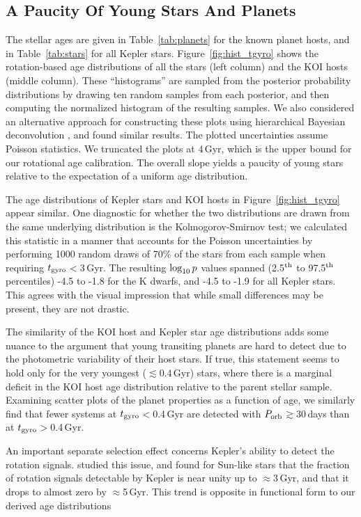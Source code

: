 \documentclass[11pt,twocolumn,tighten,linenumbers,trackchanges]{aastex63}
\begin{document}
\subsection{A Paucity Of Young Stars And Planets}

The stellar ages are given in Table~\ref{tab:planets} for the known
planet hosts, and in Table~\ref{tab:stars} for all Kepler stars.
Figure~\ref{fig:hist_tgyro} shows the rotation-based age distributions
of all the stars (left column) and the KOI hosts (middle column).
These ``histograms'' are sampled from the posterior probability
distributions by drawing ten random samples from each posterior, and
then computing the normalized histogram of the resulting samples.
We also considered an alternative approach for constructing these
plots using hierarchical Bayesian deconvolution
\citep{Masuda2022infer}, and found similar results.  The plotted
uncertainties assume Poisson statistics.  We truncated the plots
at $4$\,Gyr, which is the upper bound for our
rotational age calibration.  The overall slope yields a paucity of
young stars relative to the expectation of a uniform age distribution.

The age distributions of Kepler stars and KOI hosts in
Figure~\ref{fig:hist_tgyro} appear similar.  One diagnostic for
whether the two distributions are drawn from the same underlying
distribution is the Kolmogorov-Smirnov test;  we calculated this
statistic in a manner that accounts for the Poisson uncertainties by
performing 1000 random draws of 70\% of the stars from each sample
when requiring $t_{\rm gyro}$$<$3\,Gyr.  The resulting $\log_{\rm
10}p$ values spanned (2.5$^{\rm th}$ to 97.5$^{\rm th}$ percentiles)
-4.5 to -1.8 for the K dwarfs, and -4.5 to -1.9 for all Kepler stars.
This agrees with the visual impression that while small differences
may be present, they are not drastic.

The similarity of the KOI host and Kepler star age distributions adds
some nuance to the argument that young transiting planets are hard to
detect due to the photometric variability of their host stars.  If
true, this statement seems to hold only for the very youngest
($\lesssim$0.4\,Gyr) stars, where there is a marginal deficit in the
KOI host age distribution relative to the parent stellar sample.
Examining scatter plots of the planet properties as a function of
age, we similarly find that fewer systems at $t_{\rm
gyro}$$<$0.4\,Gyr are detected with $P_{\rm orb}$$\gtrsim$30\,days
than at $t_{\rm gyro}$$>$0.4\,Gyr.

An important separate selection effect concerns Kepler's ability to
detect the rotation signals.  \citet{2022ApJ...937...94M} studied this
issue, and found for Sun-like stars that the fraction of rotation
signals detectable by Kepler is near unity up to $\approx$3\,Gyr, and
that it drops to almost zero by $\approx$5\,Gyr.  This trend is
opposite in functional form to our derived age distributions
\end{document}
